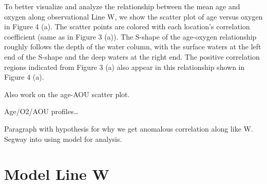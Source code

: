 To better visualize and analyze the relationship between the mean age and oxygen along observational Line W, we show the scatter plot of age versus oxygen in Figure 4 (a). The scatter points are colored with each location’s correlation coefficient (same as in Figure 3 (a)). The S-shape of the age-oxygen relationship roughly follows the depth of the water column, with the surface waters at the left end of the S-shape and the deep waters at the right end. The positive correlation regions indicated from Figure 3 (a) also appear in this relationship shown in Figure 4 (a).

Also work on the age-AOU scatter plot.

Age/O2/AOU profiles…

Paragraph with hypothesis for why we get anomalous correlation along like W. Segway into using model for analysis.

\section{Model Line W}


